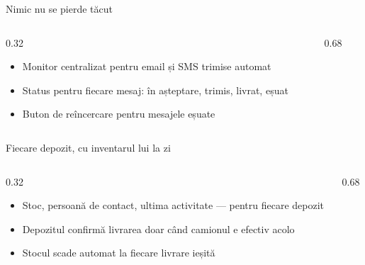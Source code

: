 \documentclass[aspectratio=169,10pt]{beamer}
\begin{document}
\begin{frame}{Nimic nu se pierde tăcut}
  \begin{columns}[T]
    \begin{column}{0.32\linewidth}
      \vspace{0.3cm}
      \begin{itemize}
        \item Monitor centralizat pentru email și SMS trimise automat
        \item Status pentru fiecare mesaj: în așteptare, trimis, livrat, eșuat
        \item Buton de reîncercare pentru mesajele eșuate
      \end{itemize}
    \end{column}
    \begin{column}{0.68\linewidth}
    \end{column}
  \end{columns}
\end{frame}

\begin{frame}{Fiecare depozit, cu inventarul lui la zi}
  \begin{columns}[T]
    \begin{column}{0.32\linewidth}
      \vspace{0.3cm}
      \begin{itemize}
        \item Stoc, persoană de contact, ultima activitate — pentru fiecare depozit
        \item Depozitul confirmă livrarea doar când camionul e efectiv acolo
        \item Stocul scade automat la fiecare livrare ieșită
      \end{itemize}
    \end{column}
    \begin{column}{0.68\linewidth}
    \end{column}
  \end{columns}
\end{frame}

\end{document}
